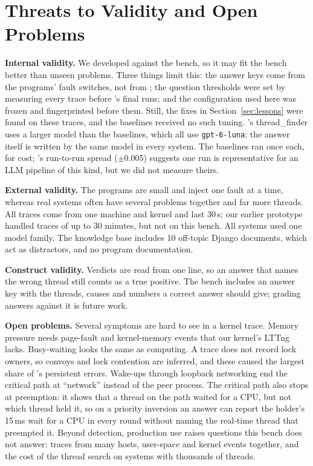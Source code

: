 \section{Threats to Validity and Open Problems}
\label{sec:threats}

\textbf{Internal validity.} We developed \sysname against the bench, so it may fit the bench better than unseen problems. Three things limit this: the answer keys come from the programs' fault switches, not from \sysname; the question thresholds were set by measuring every trace before \sysname's final runs; and the configuration used here was frozen and fingerprinted before them. Still, the fixes in Section~\ref{sec:lessons} were found on these traces, and the baselines received no such tuning. \sysname's thread\_finder uses a larger model than the baselines, which all use \texttt{gpt-6-luna}; the answer itself is written by the same model in every system. The baselines ran once each, for cost; \sysname's run-to-run spread ($\pm$0.005) suggests one run is representative for an LLM pipeline of this kind, but we did not measure theirs.

\textbf{External validity.} The programs are small and inject one fault at a time, whereas real systems often have several problems together and far more threads. All traces come from one machine and kernel and last 30\,s; our earlier prototype handled traces of up to 30 minutes, but not on this bench. All systems used one model family. The knowledge base includes 10 off-topic Django documents, which act as distractors, and no program documentation.

\textbf{Construct validity.} Verdicts are read from one line, so an answer that names the wrong thread still counts as a true positive. The bench includes an answer key with the threads, causes and numbers a correct answer should give; grading answers against it is future work.

\textbf{Open problems.} Several symptoms are hard to see in a kernel trace. Memory pressure needs page-fault and kernel-memory events that our kernel's LTTng lacks. Busy-waiting looks the same as computing. A trace does not record lock owners, so convoys and lock contention are inferred, and these caused the largest share of \sysname's persistent errors. Wake-ups through loopback networking end the critical path at ``network'' instead of the peer process. The critical path also stops at preemption: it shows that a thread on the path waited for a CPU, but not which thread held it, so on a priority inversion an answer can report the holder's 15\,ms wait for a CPU in every round without naming the real-time thread that preempted it. Beyond detection, production use raises questions this bench does not answer: traces from many hosts, user-space and kernel events together, and the cost of the thread search on systems with thousands of threads.
